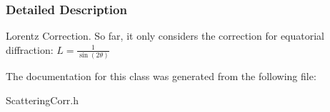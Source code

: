 \subsubsection{Detailed Description}
Lorentz Correction. So far, it only considers the correction for equatorial diffraction: $ L = \frac{1}{\sin(2\theta)} $ 

The documentation for this class was generated from the following file:\begin{DoxyCompactItemize}
\item 
ScatteringCorr.h\end{DoxyCompactItemize}
